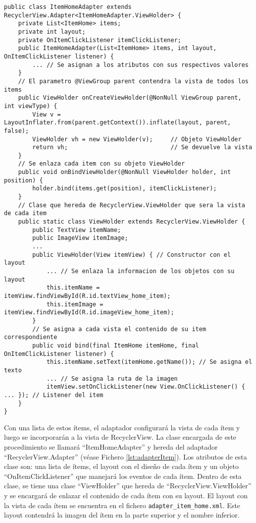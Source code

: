 \begin{lstlisting}[caption={Fichero \texttt{ItemHomeAdapter.java}, clase que construye las vistas de los ítems.},  label={lst:adapterItem}]
public class ItemHomeAdapter extends RecyclerView.Adapter<ItemHomeAdapter.ViewHolder> {
    private List<ItemHome> items;
    private int layout;
    private OnItemClickListener itemClickListener;
    public ItemHomeAdapter(List<ItemHome> items, int layout, OnItemClickListener listener) {
        ... // Se asignan a los atributos con sus respectivos valores
    }
    // El parametro @ViewGroup parent contendra la vista de todos los items
    public ViewHolder onCreateViewHolder(@NonNull ViewGroup parent, int viewType) {
        View v = LayoutInflater.from(parent.getContext()).inflate(layout, parent, false);
        ViewHolder vh = new ViewHolder(v);     // Objeto ViewHolder  
        return vh;                             // Se devuelve la vista    
    }
    // Se enlaza cada item con su objeto ViewHolder
    public void onBindViewHolder(@NonNull ViewHolder holder, int position) {
        holder.bind(items.get(position), itemClickListener);
    }
    // Clase que hereda de RecyclerView.ViewHolder que sera la vista de cada item
    public static class ViewHolder extends RecyclerView.ViewHolder { 
        public TextView itemName;     
        public ImageView itemImage;   
        ...
        public ViewHolder(View itemView) { // Constructor con el layout
            ... // Se enlaza la informacion de los objetos con su layout
            this.itemName = itemView.findViewById(R.id.textView_home_item);     
            this.itemImage = itemView.findViewById(R.id.imageView_home_item);
        }
        // Se asigna a cada vista el contenido de su item correspondiente 
        public void bind(final ItemHome itemHome, final OnItemClickListener listener) {
            this.itemName.setText(itemHome.getName()); // Se asigna el texto
            ... // Se asigna la ruta de la imagen
            itemView.setOnClickListener(new View.OnClickListener() { ... }); // Listener del item
    }
}
\end{lstlisting}
Con una lista de estos ítems, el adaptador configurará la vista de cada ítem y luego se incorporarán a la vista de RecyclerView. La clase encargada de este procedimiento se llamará ``ItemHomeAdapter'' y hereda del adaptador ``RecyclerView.Adapter'' (véase Fichero \ref{lst:adapterItem}). Los atributos de esta clase son: una lista de ítems, el layout con el diseño de cada ítem y un objeto ``OnItemClickListener'' que manejará los eventos de cada ítem. Dentro de esta clase, se tiene una clase ``ViewHolder'' que hereda de ``RecyclerView.ViewHolder'' y se encargará de enlazar el contenido de cada ítem con su layout. El layout con la vista de cada ítem se encuentra en el fichero \texttt{adapter\_item\_home.xml}. Este layout contendrá la imagen del ítem en la parte superior y el nombre inferior.
     
